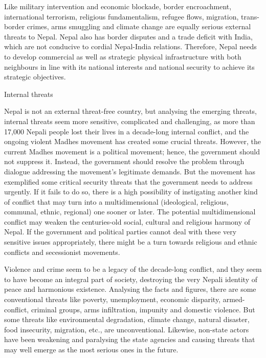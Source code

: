 \documentclass[
  openany]{book}
\begin{document}
Like military intervention and economic blockade, border encroachment, international terrorism, religious fundamentalism, refugee flows, migration, trans-border crimes, arms smuggling and climate change are equally serious external threats to Nepal. Nepal also has border disputes and a trade deficit with India, which are not conducive to cordial Nepal-India relations. Therefore, Nepal needs to develop commercial as well as strategic physical infrastructure with both neighbours in line with its national interests and national security to achieve its strategic objectives.

Internal threats

Nepal is not an external threat-free country, but analysing the emerging threats, internal threats seem more sensitive, complicated and challenging, as more than 17,000 Nepali people lost their lives in a decade-long internal conflict, and the ongoing violent Madhes movement has created some crucial threats. However, the current Madhes movement is a political movement; hence, the government should not suppress it. Instead, the government should resolve the problem through dialogue addressing the movement's legitimate demands. But the movement has exemplified some critical security threats that the government needs to address urgently. If it fails to do so, there is a high possibility of instigating another kind of conflict that may turn into a multidimensional (ideological, religious, communal, ethnic, regional) one sooner or later. The potential multidimensional conflict may weaken the centuries-old social, cultural and religious harmony of Nepal. If the government and political parties cannot deal with these very sensitive issues appropriately, there might be a turn towards religious and ethnic conflicts and secessionist movements.

Violence and crime seem to be a legacy of the decade-long conflict, and they seem to have become an integral part of society, destroying the very Nepali identity of peace and harmonious existence. Analysing the facts and figures, there are some conventional threats like poverty, unemployment, economic disparity, armed-conflict, criminal groups, arms infiltration, impunity and domestic violence. But some threats like environmental degradation, climate change, natural disaster, food insecurity, migration, etc., are unconventional. Likewise, non-state actors have been weakening and paralysing the state agencies and causing threats that may well emerge as the most serious ones in the future.
\end{document}
